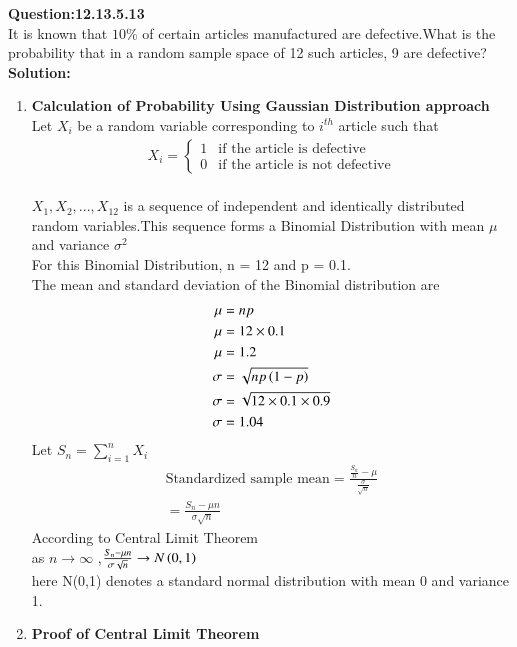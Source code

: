 \documentclass[journal,12pt,twocolumn]{IEEEtran}
\begin{document}
\textbf{Question:12.13.5.13}\\
 	It is known that $ 10\% $ of certain articles manufactured are defective.What is the probability that in a random sample space of 12 such articles, 9 are defective?
\\
 \textbf{Solution:}
 \\
 \begin{enumerate}[label=(\Roman*), align=left]
    \item \textbf{Calculation of Probability Using Gaussian Distribution approach}
\\Let $X_i$ be a random variable corresponding to $i^{th}$ article such that
\begin{align}
        X_i=  
        \begin{cases}
            1 &  \text{if the article is defective} \\
            0 &  \text{if the article is not defective}
        \end{cases}
    \end{align}
\\$X_1,X_2,...,X_{12}$ is a sequence of independent and identically distributed random variables.This sequence forms a Binomial Distribution with mean $\mu$ and variance $\sigma^2$
 \\For this Binomial Distribution, n = 12 and p = 0.1.
 \\The mean and standard deviation of the Binomial distribution are
 \begin{align}
    \mu &= np\\
    \mu &= 12\times0.1\nonumber\\
    \mu &= 1.2\\
    \sigma&= \sqrt{np\left(1-p\right)}\\
    \sigma&= \sqrt{12\times0.1\times0.9}\nonumber\\
    \sigma&= 1.04
    \end{align}
Let $S_n = \sum_{i=1}^{n} X_i$
\begin{align}
      \text{Standardized sample mean} = \frac{\frac{S_n}{n}-\mu}{\frac{\sigma}{\sqrt{n}}}\nonumber \\
      = \frac{S_n-\mu{n}}{\sigma{\sqrt{n}}} 
    \end{align}
According to Central Limit Theorem
\\as $n \to \infty$ ,$\frac{S_n -\mu{n}}{\sigma{\sqrt{n}}} \to N\left(0,1\right)$
\\here N(0,1) denotes a standard normal distribution with mean 0 and variance 1.
\item \textbf{Proof of Central Limit Theorem}

\end{enumerate}
\end{document}
